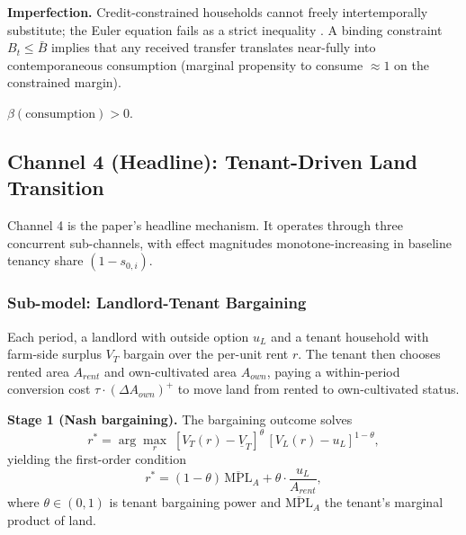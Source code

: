 \textbf{Imperfection.} Credit-constrained households cannot freely intertemporally substitute; the Euler equation fails as a strict inequality \citep{BlundellPistaferri2003_consumption}. A binding constraint $B_t \le \bar B$ implies that any received transfer translates near-fully into contemporaneous consumption (marginal propensity to consume $\approx 1$ on the constrained margin).

\begin{prediction}[Channel 3]
\label{pred:ch3}
$\beta(\text{consumption}) > 0$.
\end{prediction}

\subsection{Channel 4 (Headline): Tenant-Driven Land Transition}
\label{sec:ch4-tenant}

Channel 4 is the paper's headline mechanism. It operates through three concurrent sub-channels, with effect magnitudes monotone-increasing in baseline tenancy share $(1 - s_{0,i})$.

\subsubsection{Sub-model: Landlord-Tenant Bargaining}
\label{sec:ch4-submodel}

Each period, a landlord with outside option $u_L$ and a tenant household with farm-side surplus $V_T$ bargain over the per-unit rent $r$. The tenant then chooses rented area $A_{rent}$ and own-cultivated area $A_{own}$, paying a within-period conversion cost $\tau \cdot (\Delta A_{own})^+$ to move land from rented to own-cultivated status.

\textbf{Stage 1 (Nash bargaining).} The bargaining outcome solves
\begin{equation}
r^* = \arg\max_r \; [V_T(r) - \underline{V}_T]^{\theta}\, [V_L(r) - u_L]^{1-\theta},
\label{eq:nash}
\end{equation}
yielding the first-order condition
\begin{equation}
r^* = (1-\theta)\, \overline{\text{MPL}}_A + \theta \cdot \frac{u_L}{A_{rent}},
\label{eq:rstar}
\end{equation}
where $\theta \in (0,1)$ is tenant bargaining power and $\overline{\text{MPL}}_A$ the tenant's marginal product of land.

